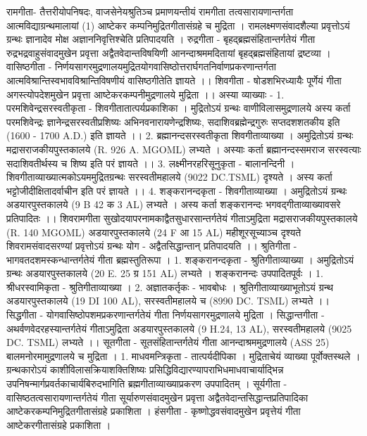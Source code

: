 रामगीता-
तैत्तरीयोपनिषदः, वाजसेनेयश्रुतिञ्च प्रमाणयन्तीयं रामगीता तत्वसारायणान्तर्गता आत्मविद्याग्रन्थमालायां (1) आष्टेकर कम्पनिमुद्रितगीतासंग्रहे च मुद्रिता । रामलक्ष्मणसंवादशैल्या प्रवृत्तोऽयं ग्रन्थः ज्ञानादेव मोक्ष अज्ञाननिवृत्तिश्चेति प्रतिपादयति ।
रुद्रगीता -
बृहद्ब्रह्मसंहितान्तर्गतेयं गीता रुद्रभद्रवाहुसंवादमुखेन प्रवृत्ता अद्वैतवेदान्तविषयिणी आनन्दाश्रममदितायां बृहद्ब्रह्मसंहितायां द्रष्टव्या ।
वासिष्ठगीता -
निर्णयसागरमुद्रणालयमुद्रितयोगवासिष्ठोत्तरार्घगतनिर्वाणप्रकरणान्तर्गता आत्मविश्रान्तिस्वभावविश्रान्तिविषणीयं वासिष्ठगीतेति ज्ञायते ।। 
शिवगीता - 
षोडशभिरध्यायैः पूर्णेयं गीता अगस्त्योपदेशमुखेन प्रवृत्ता आष्टेकरकम्पनीमुद्रणालये मुद्रिता ।। अस्या व्याख्याः -
1.  परमशिवेन्द्रसरस्वतीकृता - शिवगीतातात्पर्यप्रकाशिका । 
मुद्रितोऽयं ग्रन्थः वाणीविलासमुद्रणालये अस्य कर्ता परमशिवेन्द्रः ज्ञानेन्द्रसरस्वतीप्रशिष्यः अभिनवनारायणेन्द्रशिष्यः, सदाशिवब्रह्मेन्द्रगुरुः सप्तदशशतकीय इति (1600 - 1700 A.D.) इति ज्ञायते ।।
2. ब्रह्मानन्दसरस्वतीकृता शिवगीताव्याख्या ।
अमुद्रितोऽयं ग्रन्थः मद्रासराजकीयपुस्तकालये (R. 926 A. MGOML) लभ्यते । अस्याः कर्ता ब्रह्मानन्दस्समराज सरस्वत्याः सदाशिवतीर्थस्य च शिष्य इति परं ज्ञायते ।।
3. लक्ष्मीनरहरिसूनुकृता - बालानन्दिनी । 
शिवगीताव्याख्यात्मकोऽयममुद्रितग्रन्थः सरस्वतीमहालये (9022 DC.TSML) दृश्यते । अस्य कर्ता भट्टोजीदीक्षितादर्वाचीन इति परं ज्ञायते ।।
4. शङ्करानन्दकृता - शिवगीताव्याख्या ।
अमुद्रितोऽयं ग्रन्थः अडयारपुस्तकालये (9 B 42 क 3 AL) लभ्यते । अस्य कर्ता शङ्करानन्दः भगवद्गीताव्याख्यावसरे प्रतिपादितः ।। 
शिवरामगीता 
सुखोदयापरनामकाद्वैतसुधारसान्तर्गतेयं गीताऽमुद्रिता मद्रासराजकीयपुस्तकालये (R. 140 MGOML) अडयारपुस्तकालये (24 F आ 15 AL) महीशूरसूच्याञ्च दृश्यते शिवरामसंवादसरण्यां प्रवृत्तोऽयं ग्रन्थः योग - अद्वैतसिद्धान्तान् प्रतिपादयति ।। 
श्रुतिगीता - भागवतदशमस्कन्धान्तर्गतेयं गीता ब्रह्मस्तुतिरूपा ।
1. शङ्करानन्दकृता - श्रुतिगीताव्याख्या । अमुद्रितोऽयं ग्रन्थः अडयारपुस्तकालये (20 E. 25 ग्र 151 AL) लभ्यते । शङ्करानन्दः उपपादितपूर्वः । 
1. श्रीधरस्वामिकृता - श्रुतिगीताव्याख्या ।
2. अज्ञातकर्तृकः - भावबोधः । श्रुतिगीताव्याख्याभूतोऽयं ग्रन्थ अडयारपुस्तकालये (19 DI 100 AL), सरस्वतीमहालये च (8990 DC. TSML) लभ्यते ।। 
सिद्धगीता - 
योगवासिष्ठोपशमप्रकरणान्तर्गतेयं गीता निर्णयसागरमुद्रणालये मुद्रिता ।
सिद्धान्तगीता - 
अथर्वणवेदरहस्यान्तर्गतेयं गीताऽमुद्रिता अडयारपुस्तकालये (9 H.24, 13 AL), सरस्वतीमहालये (9025 DC. TSML) लभ्यते ।। 
सूतगीता - सूतसंहितान्तर्गतेयं गीता आनन्दाश्रममुद्रणालये (ASS 25) बालमनोरमामुद्रणालये च मुद्रिता । 
1. माधवमन्त्रिकृता - तात्पर्यदीपिका ।
मुद्रिताचेयं व्याख्या पूर्वोक्तस्थले । ग्रन्थकारोऽयं काशीविलासक्रियाशक्तिशिष्यः प्रसिद्धिविद्यारण्यापराभिधमाधवाचार्याद्भिन्न उपनिषन्मार्गप्रवर्तकाचार्यबिरुदभागिति ब्रह्मगीताव्याख्याप्रकरण उपपादितम् । 
सूर्यगीता -
वासिष्ठतत्वसारायणान्तर्गतेयं गीता सूर्यारुणसंवादमुखेन प्रवृत्ता अद्वैतवेदान्तसिद्धान्तप्रतिपादिका आष्टेकरकम्पनिमुद्रितगीतासंग्रहे प्रकाशिता ।
हंसगीता - 
कृष्णोद्धवसंवादमुखेन प्रवृत्तेयं गीता आष्टेकरगीतासंग्रहे प्रकाशिता ।
